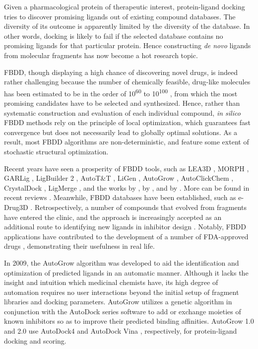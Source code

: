 Given a pharmacological protein of therapeutic interest, protein-ligand docking tries to discover promising ligands out of existing compound databases. The diversity of its outcome is apparently limited by the diversity of the database. In other words, docking is likely to fail if the selected database contains no promising ligands for that particular protein. Hence constructing \textit{de novo} ligands from molecular fragments has now become a hot research topic.

FBDD, though displaying a high chance of discovering novel drugs, is indeed rather challenging because the number of chemically feasible, drug-like molecules has been estimated to be in the order of 10\textsuperscript{60} to 10\textsuperscript{100} \citep{1104}, from which the most promising candidates have to be selected and synthesized. Hence, rather than systematic construction and evaluation of each individual compound, \textit{in silico} FBDD methods rely on the principle of local optimization, which guarantees fast convergence but does not necessarily lead to globally optimal solutions. As a result, most FBDD algorithms are non-deterministic, and feature some extent of stochastic structural optimization.

Recent years have seen a prosperity of FBDD tools, such as LEA3D \citep{1223}, MORPH \citep{365}, GARLig \citep{471}, LigBuilder 2 \citep{749}, AutoT\&T \citep{780}, LiGen \citep{1328,1495}, AutoGrow \citep{466,1354}, AutoClickChem \citep{1051}, CrystalDock \citep{954}, LigMerge \citep{1181}, and the works by \citeauthor{1496} \citep{1496,1500}, by \citeauthor{1497} \citep{1497}, and by \citeauthor{1498} \citep{1498}. More can be found in recent reviews \citep{1493,1499}. Meanwhile, FBDD databases have been established, such as e-Drug3D \citep{1125}. Retrospectively, a number of compounds that evolved from fragments have entered the clinic, and the approach is increasingly accepted as an additional route to identifying new ligands in inhibitor design \citep{363,367,472,474,1006}. Notably, FBDD applications have contributed to the development of a number of FDA-approved drugs \citep{363}, demonstrating their usefulness in real life.

In 2009, the AutoGrow algorithm \citep{466} was developed to aid the identification and optimization of predicted ligands in an automatic manner. Although it lacks the insight and intuition which medicinal chemists have, its high degree of automation requires no user interactions beyond the initial setup of fragment libraries and docking parameters. AutoGrow utilizes a genetic algorithm in conjunction with the AutoDock series software \citep{596,595} to add or exchange moieties of known inhibitors so as to improve their predicted binding affinities. AutoGrow 1.0 and 2.0 use AutoDock4 \citep{596} and AutoDock Vina \citep{595}, respectively, for protein-ligand docking and scoring.

